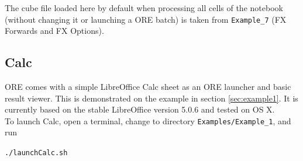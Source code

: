 \documentclass[12pt, a4paper]{article}
\begin{document}
The cube file loaded here by default when processing all cells of the notebook (without changing it or launching a ORE
batch) is taken from {\tt Example\_7} (FX Forwards and FX Options).


\subsection{Calc}\label{sec:calc}

ORE comes with a simple LibreOffice Calc \cite{LO} sheet as an ORE launcher and basic result viewer. This is
demonstrated on the example in section \ref{sec:example1}. It is currently based on the stable LibreOffice version 5.0.6
and tested on OS X. \\

To launch Calc, open a terminal, change to directory {\tt Examples/Example\_1}, and run

\medskip
{\centerline{\tt ./launchCalc.sh} }
\medskip
\end{document}
